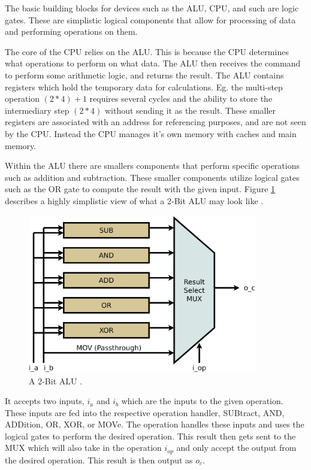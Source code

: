 The basic building blocks for devices such as the ALU, CPU, and such are logic gates.
These are simplistic logical components that allow for processing of data and performing operations on them.

The core of the CPU relies on the ALU.
This is because the CPU determines what operations to perform on what data.
The ALU then receives the command to perform some arithmetic logic, and returns the result.
The ALU contains registers which hold the temporary data for calculations.
Eg. the multi-step operation $(2 * 4) + 1$ requires several cycles and the ability to store the intermediary step $(2 * 4)$ without sending it as the result.
These smaller registers are associated with an address for referencing purposes, and are not seen by the CPU.
Instead the CPU manages it's own memory with caches and main memory.

Within the ALU there are smallers components that perform specific operations such as addition and subtraction.
These smaller components utilize logical gates such as the OR gate to compute the result with the given input.
Figure \ref{fig:2BitALUSimp} describes a highly simplistic view of what a 2-Bit ALU may look like \cite{SimpleALU}.

\begin{figure}[htb]
    \centering
    \includegraphics[width=10cm]{Images/alu-simple.png}
       \caption{A 2-Bit ALU \cite{SimpleALU}.}
           \label{fig:2BitALUSimp}
\end{figure}

It accepts two inputs, $i_a$ and $i_b$ which are the inputs to the given operation.
These inputs are fed into the respective operation handler, SUBtract, AND, ADDition, OR, XOR, or MOVe.
The operation handles these inputs and uses the logical gates to perform the desired operation.
This result then gets sent to the MUX which will also take in the operation $i_{op}$ and only accept the output from the desired operation.
This result is then output as $o_c$.

